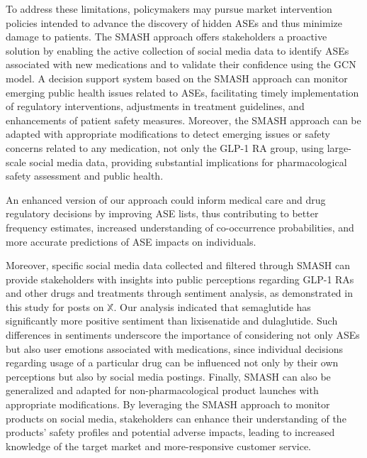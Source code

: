 \documentclass[referee,bst/sn-basic]{sn-jnl}%
\theoremstyle{thmstyletwo}%
\theoremstyle{thmstylethree}%
\begin{document}
To address these limitations, policymakers may pursue market intervention policies intended to advance the discovery of hidden ASEs and thus minimize damage to patients.
The SMASH approach offers stakeholders a proactive solution by enabling the active collection of social media data to identify ASEs associated with new medications and to validate their confidence using the GCN model. A decision support system based on the SMASH approach can monitor emerging public health issues related to ASEs, facilitating timely implementation of regulatory interventions, adjustments in treatment guidelines, and enhancements of patient safety measures. Moreover, the SMASH approach can be adapted with appropriate modifications to detect emerging issues or safety concerns related to any medication, not only the GLP-1 RA group, using large-scale social media data, providing substantial implications for pharmacological safety assessment and public health.

An enhanced version of our approach could inform medical care and drug regulatory decisions by improving ASE lists, thus contributing to better frequency estimates, increased understanding of co-occurrence probabilities, and more accurate predictions of ASE impacts on individuals.

Moreover, specific social media data collected and filtered through SMASH can provide stakeholders with insights into public perceptions regarding GLP-1 RAs and other drugs and treatments through sentiment analysis, as demonstrated in this study for posts on $\mathbb{X}$. 
Our analysis indicated that semaglutide has significantly more positive sentiment than lixisenatide and dulaglutide.
Such differences in sentiments underscore the importance of considering not only ASEs but also user emotions associated with medications, since individual decisions regarding usage of a particular drug  can be influenced not only by their own perceptions but also by social media postings.
Finally, SMASH can also be generalized and adapted for non-pharmacological product launches with appropriate modifications. 
By leveraging the SMASH approach to monitor products on social media, stakeholders can enhance their understanding of the products' safety profiles and potential adverse impacts, leading to increased knowledge of the target market and more-responsive customer service.


\end{document}
